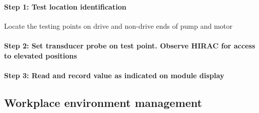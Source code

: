 \paragraph{Step 1: Test location identification}

Locate the testing points on drive and non-drive ends of pump and motor %


\paragraph{Step 2: Set transducer probe on test point. Observe HIRAC for access to elevated positions}
\paragraph{Step 3: Read and record value as indicated on module display}


\subsection{Workplace environment management}
\label{237}
%

